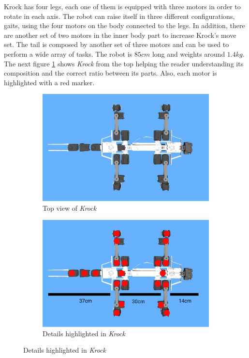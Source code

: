 \documentclass[../document.tex]{subfiles}
\begin{document}
Krock has four legs, each one of them is equipped with three motors in order to rotate in each axis. The robot can raise itself in three different configurations, gaits, using the four motors on the body connected to the legs. In addition, there are another set of two motors in the inner body part to increase Krock's move set. 
The tail is composed by another set of three motors and can be used to perform a wide array of tasks.
The robot is $85cm$ long and weights around $1.4kg$. The next figure \ref{fig:krock-top} shows \emph{Krock} from the top helping the reader understanding its composition and the correct ratio between its parts. Also, each motor is highlighted with a red marker.
\begin{figure}[H]
\centering
     \begin{subfigure}[b]{0.49\textwidth}
    \includegraphics[width=\textwidth]{../img/krock-top.jpg}
    \caption{Top view of \emph{Krock}}
   	\end{subfigure}
     \begin{subfigure}[b]{0.49\textwidth}
      \includegraphics[width=\textwidth]{../img/krock-top-highlight.png}
    \caption{Details highlighted in \emph{Krock}}
   	\end{subfigure}
   	    \label{fig:krock-top}

\end{figure}
\end{document}
